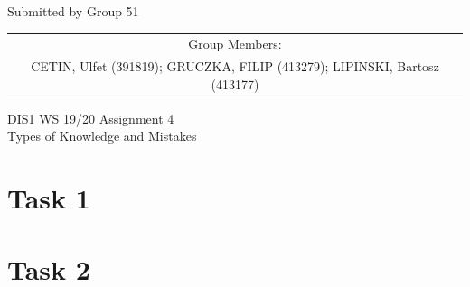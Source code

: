 \documentclass[a4paper,11pt,oneside]{scrreprt}
\begin{document}
\begin{center}
	Submitted by Group 51
	
	\bigskip
	
	\begin{tabular}{c}
	Group Members: \\
	CETIN, Ulfet (391819); GRUCZKA, FILIP (413279);	LIPINSKI, Bartosz (413177) \\
	\end{tabular}

	\bigskip
	
	DIS1 WS 19/20 Assignment 4\\
	Types of Knowledge and Mistakes
	
\end{center}

\section*{Task 1}



\vspace{5cm}

\bigskip

\bigskip

\bigskip

\begin{figure}[H]
	\centering 
	
\end{figure}


\clearpage
\section*{Task 2}
\end{document}
